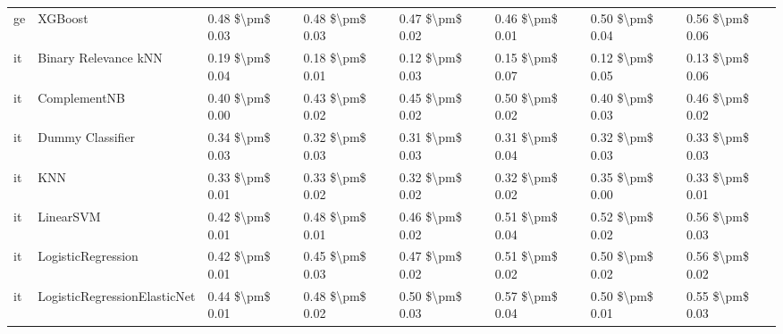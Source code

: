 \begin{tabular}{llllllll}
      ge &                         XGBoost & 0.48 \$\textbackslash pm\$ 0.03 &           0.48 \$\textbackslash pm\$ 0.03 &       0.47 \$\textbackslash pm\$ 0.02 &        0.46 \$\textbackslash pm\$ 0.01 &                         0.50 \$\textbackslash pm\$ 0.04 &     0.56 \$\textbackslash pm\$ 0.06 \\
      it &            Binary Relevance kNN & 0.19 \$\textbackslash pm\$ 0.04 &           0.18 \$\textbackslash pm\$ 0.01 &       0.12 \$\textbackslash pm\$ 0.03 &        0.15 \$\textbackslash pm\$ 0.07 &                         0.12 \$\textbackslash pm\$ 0.05 &     0.13 \$\textbackslash pm\$ 0.06 \\
      it &                    ComplementNB & 0.40 \$\textbackslash pm\$ 0.00 &           0.43 \$\textbackslash pm\$ 0.02 &       0.45 \$\textbackslash pm\$ 0.02 &        0.50 \$\textbackslash pm\$ 0.02 &                         0.40 \$\textbackslash pm\$ 0.03 &     0.46 \$\textbackslash pm\$ 0.02 \\
      it &                Dummy Classifier & 0.34 \$\textbackslash pm\$ 0.03 &           0.32 \$\textbackslash pm\$ 0.03 &       0.31 \$\textbackslash pm\$ 0.03 &        0.31 \$\textbackslash pm\$ 0.04 &                         0.32 \$\textbackslash pm\$ 0.03 &     0.33 \$\textbackslash pm\$ 0.03 \\
      it &                             KNN & 0.33 \$\textbackslash pm\$ 0.01 &           0.33 \$\textbackslash pm\$ 0.02 &       0.32 \$\textbackslash pm\$ 0.02 &        0.32 \$\textbackslash pm\$ 0.02 &                         0.35 \$\textbackslash pm\$ 0.00 &     0.33 \$\textbackslash pm\$ 0.01 \\
      it &                       LinearSVM & 0.42 \$\textbackslash pm\$ 0.01 &           0.48 \$\textbackslash pm\$ 0.01 &       0.46 \$\textbackslash pm\$ 0.02 &        0.51 \$\textbackslash pm\$ 0.04 &                         0.52 \$\textbackslash pm\$ 0.02 &     0.56 \$\textbackslash pm\$ 0.03 \\
      it &              LogisticRegression & 0.42 \$\textbackslash pm\$ 0.01 &           0.45 \$\textbackslash pm\$ 0.03 &       0.47 \$\textbackslash pm\$ 0.02 &        0.51 \$\textbackslash pm\$ 0.02 &                         0.50 \$\textbackslash pm\$ 0.02 &     0.56 \$\textbackslash pm\$ 0.02 \\
      it &    LogisticRegressionElasticNet & 0.44 \$\textbackslash pm\$ 0.01 &           0.48 \$\textbackslash pm\$ 0.02 &       0.50 \$\textbackslash pm\$ 0.03 &        0.57 \$\textbackslash pm\$ 0.04 &                         0.50 \$\textbackslash pm\$ 0.01 &     0.55 \$\textbackslash pm\$ 0.03 \\

\end{tabular}
